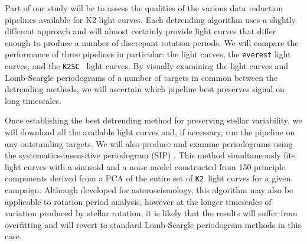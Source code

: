 \documentclass[12pt]{article}
\newcommand{\ktwosc}{{\tt K2SC}}
\newcommand{\ktwo}{{\tt K2}}
\begin{document}
Part of our study will be to assess the qualities of the various data
reduction pipelines available for K2 light curves.
Each detrending algorithm uses a slightly different approach and will almost
certainly provide light curves that differ enough to produce a number of
discrepant rotation periods.
We will compare the performance of three pipelines in particular: the
\citet{Vanderburg2015} light curves, the {\tt everest} \citet{luger2016} light
curves, and the \ktwosc\ \citet{aigrain2016} light curves.
By visually examining the light curves and Lomb-Scargle periodograms of a
number of targets in common between the detrending methods, we will ascertain
which pipeline best preserves signal on long timescales.

Once establishing the best detrending method for preserving stellar
variability, we will download all the available light curves and, if
necessary, run the pipeline on any outstanding targets.
We will also produce and examine periodograms using the
systematics-insensitive periodogram (SIP) \citep{angus2015}.
This method simultaneously fits light curves with a sinusoid and a noise
model constructed from 150 principle components derived from a PCA of the
entire set of \ktwo\ light curves for a given campaign.
Although developed for asteroseismology, this algorithm may also be applicable
to rotation period analysis, however at the longer timescales of variation
produced by stellar rotation, it is likely that the results will suffer from
overfitting and will revert to standard Lomb-Scargle periodogram methods in
this case.
\end{document}
